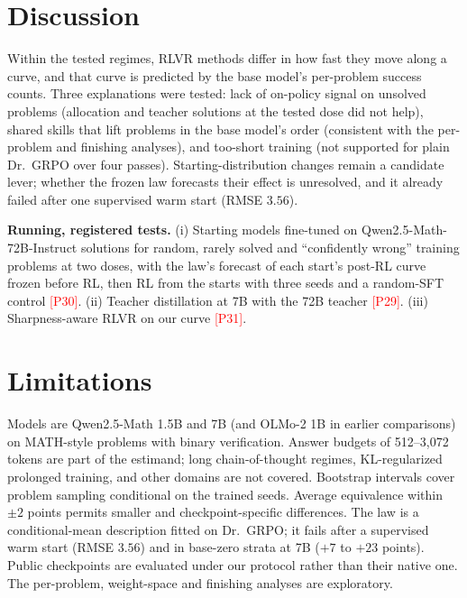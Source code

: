 \documentclass{article}
\theoremstyle{plain}
\newcommand{\pending}[1]{\textcolor{red}{[#1]}}
\begin{document}
\section{Discussion}\label{sec:discussion}
Within the tested regimes, RLVR methods differ in how fast they move along a curve, and that curve is predicted by the base model's per-problem success counts. Three explanations were tested: lack of on-policy signal on unsolved problems (allocation and teacher solutions at the tested dose did not help), shared skills that lift problems in the base model's order (consistent with the per-problem and finishing analyses), and too-short training (not supported for plain Dr.\ GRPO over four passes). Starting-distribution changes remain a candidate lever; whether the frozen law forecasts their effect is unresolved, and it already failed after one supervised warm start (RMSE $3.56$).

\textbf{Running, registered tests.} (i) Starting models fine-tuned on Qwen2.5-Math-72B-Instruct solutions for random, rarely solved and ``confidently wrong'' training problems at two doses, with the law's forecast of each start's post-RL curve frozen before RL, then RL from the starts with three seeds and a random-SFT control \pending{P30}. (ii) Teacher distillation at 7B with the 72B teacher \pending{P29}. (iii) Sharpness-aware RLVR on our curve \pending{P31}.

\section{Limitations}
Models are Qwen2.5-Math 1.5B and 7B (and OLMo-2 1B in earlier comparisons) on MATH-style problems with binary verification. Answer budgets of 512--3,072 tokens are part of the estimand; long chain-of-thought regimes, KL-regularized prolonged training, and other domains are not covered. Bootstrap intervals cover problem sampling conditional on the trained seeds. Average equivalence within $\pm2$ points permits smaller and checkpoint-specific differences. The law is a conditional-mean description fitted on Dr.\ GRPO; it fails after a supervised warm start (RMSE $3.56$) and in base-zero strata at 7B ($+7$ to $+23$ points). Public checkpoints are evaluated under our protocol rather than their native one. The per-problem, weight-space and finishing analyses are exploratory.




\newpage
\appendix
\onecolumn
\end{document}
